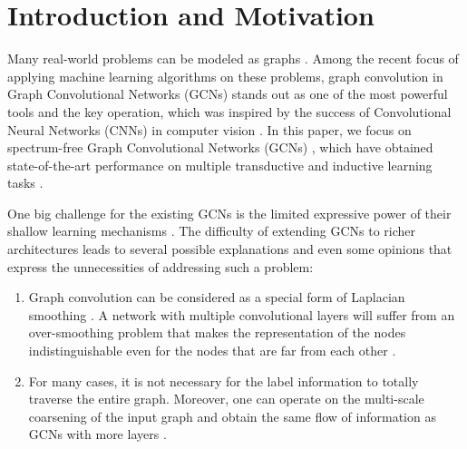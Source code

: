 \documentclass{article}
\begin{document}
\section{Introduction and Motivation}\label{sec:introduction}
Many real-world problems can be modeled as graphs \cite{hamilton2017inductive, kipf2016classification, liao2019lanczos, gilmer2017neural, monti2017geometric, defferrard2016fast}. Among the recent focus of applying machine learning algorithms on these problems, graph convolution in Graph Convolutional Networks (GCNs) stands out as one of the most powerful tools and the key operation, which was inspired by the success of Convolutional Neural Networks (CNNs) \cite{lecun1998gradient} in computer vision \cite{li2018adaptive}. In this paper, we focus on spectrum-free Graph Convolutional Networks (GCNs) \cite{bronstein2016geometric, shuman2012emerging}, which have obtained state-of-the-art performance on multiple transductive and inductive learning tasks \cite{defferrard2016fast, kipf2016classification, liao2019lanczos, chen2018fastgcn, chen2017stochastic}.
\par
One big challenge for the existing GCNs is the limited expressive power of their shallow learning mechanisms \cite{zhang2018graph, wu2019survey}. The difficulty of extending GCNs to richer architectures leads to several possible explanations and even some opinions that express the unnecessities of addressing such a problem:
\begin{enumerate}[leftmargin=12pt]
\item Graph convolution can be considered as a special form of Laplacian smoothing \cite{li2018deeper}. A network with multiple convolutional layers will suffer from an over-smoothing problem that makes the representation of the nodes indistinguishable even for the nodes that are far from each other \cite{zhang2018graph}. \item For many cases, it is not necessary for the label information to totally traverse the entire graph. Moreover, one can operate on the multi-scale coarsening of the input graph and obtain the same flow of information as GCNs with more layers \cite{bronstein2016geometric}.
\end{enumerate}
\par
\end{document}
